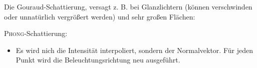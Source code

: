 	Die Gouraud-Schattierung, versagt z. B. bei Glanzlichtern (können verschwinden oder unnatürlich vergrößert
	werden) und sehr großen Flächen:
	\begin{center}
	\end{center}
	\textsc{Phong}-Schattierung:
	\begin{itemize}
	 \item Es wird nich die Intensität interpoliert, sondern der Normalvektor. Für jeden Punkt wird die
		Beleuchtungsrichtung neu ausgeführt.
	\end{itemize}





